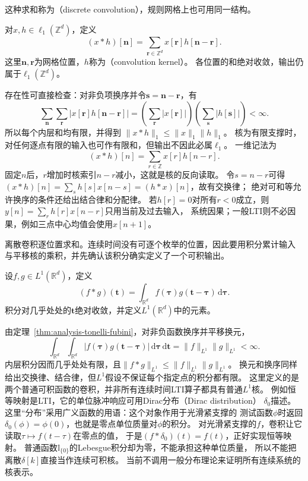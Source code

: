 这种求和称为（discrete convolution），规则网格上也可用同一结构。
\begin{definition}[网格上的离散卷积]
  \label{def:signal-analysis-discrete-convolution}
  对$x,h\in\ell_1(\mathbb Z^d)$，定义
  \begin{equation}
    (x*h)[\bm n]=\sum_{\bm r\in\mathbb Z^d}x[\bm r]h[\bm n-\bm r].
    \label{eq:signal-analysis-discrete-multidimensional-convolution}
  \end{equation}
  这里$\bm n,\bm r$为网格位置，$h$称为（convolution kernel）。
  各位置的和绝对收敛，输出仍属于$\ell_1(\mathbb Z^d)$。
\end{definition}
存在性可直接检查：对非负项换序并令$\bm s=\bm n-\bm r$，有
\[
  \sum_{\bm n}\sum_{\bm r}|x[\bm r]h[\bm n-\bm r]|
  =\left(\sum_{\bm r}|x[\bm r]|\right)
   \left(\sum_{\bm s}|h[\bm s]|\right)<\infty.
\]
所以每个内层和均有限，并得到
$\|x*h\|_1\leq\|x\|_1\|h\|_1$。
核为有限支撑时，对任何逐点有限的输入也可作有限和，但输出不因此必属$\ell_1$。
一维记法为
\begin{equation}
  (x*h)[n]=\sum_{r\in\mathbb Z}x[r]h[n-r].
  \label{eq:signal-analysis-linear-convolution}
\end{equation}
固定$n$后，$r$增加时核索引$n-r$减小，这就是核的反向读取。
令$s=n-r$可得$(x*h)[n]=\sum_s h[s]x[n-s]=(h*x)[n]$，故有交换律；
绝对可和等允许换序的条件还给出结合律和分配律。
若$h[r]=0$对所有$r<0$成立，则$y[n]=\sum_r h[r]x[n-r]$只用当前及过去输入，
系统因果；一般LTI则不必因果，例如三点中心均值会使用$x[n+1]$。

离散卷积逐位置求和。连续时间没有可逐个枚举的位置，因此要用积分累计输入
与平移核的乘积，并先确认该积分确实定义了一个可积输出。
\begin{definition}[连续卷积]
  \label{def:signal-analysis-continuous-convolution}
  设$f,g\in L^1(\mathbb R^d)$，定义
  \begin{equation}
    (f*g)(\bm t)=\int_{\mathbb R^d}f(\bm\tau)g(\bm t-\bm\tau)\,\mathrm d\bm\tau.
    \label{eq:signal-analysis-continuous-convolution}
  \end{equation}
  积分对几乎处处的$\bm t$绝对收敛，并定义$L^1(\mathbb R^d)$中的元素。
\end{definition}
由定理~\ref{thm:analysis-tonelli-fubini}，对非负函数换序并平移换元，
\[
  \int_{\mathbb R^d}\int_{\mathbb R^d}
  |f(\bm\tau)g(\bm t-\bm\tau)|\,\mathrm d\bm\tau\,\mathrm d\bm t
  =\|f\|_{L^1}\|g\|_{L^1}<\infty.
\]
内层积分因而几乎处处有限，且$\|f*g\|_{L^1}\leq\|f\|_{L^1}\|g\|_{L^1}$。
换元和换序同样给出交换律、结合律，但$L^1$假设不保证每个指定点的积分都有限。
这里定义的是两个普通可积函数的卷积，并非所有连续时间LTI算子都具有普通$L^1$核。
例如恒等映射是LTI，它的单位脉冲响应可用Dirac分布（Dirac distribution）
$\delta_0$描述。这里“分布”采用广义函数的用语：这个对象作用于光滑紧支撑的
测试函数$\phi$时返回$\delta_0(\phi)=\phi(0)$，也就是零点单位质量对$\phi$的积分。
对光滑紧支撑的$f$，卷积让它读取$\tau\mapsto f(t-\tau)$在零点的值，
于是$(f*\delta_0)(t)=f(t)$，正好实现恒等映射。
普通函数$\mathbb I_{\{0\}}$的Lebesgue积分却为零，不能承担这种单位质量，
所以不能把离散$\delta[k]$直接当作连续可积核。
当前不调用一般分布理论来证明所有连续系统的核表示。

